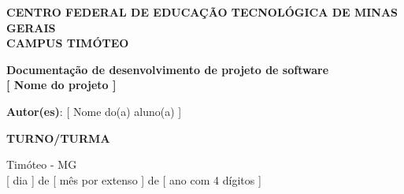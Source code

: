 \begin{center}

{\fontsize{11}{\baselineskip}\selectfont
\textbf{CENTRO FEDERAL DE EDUCAÇÃO TECNOLÓGICA DE MINAS GERAIS \\}}
\vspace{-0.3cm}
{\fontsize{8}{\baselineskip}\selectfont
\textbf{CAMPUS TIMÓTEO \\}}

\vspace{7cm}

{    %
\fontsize{19}{\baselineskip}\selectfont
\textbf{Documentação de desenvolvimento de projeto de software\\}
\textbf{  {\color{red}[ Nome do projeto ]} }}
    
\vspace{7cm}


{\fontsize{12}{\baselineskip}\selectfont
\textbf{Autor(es)}: {\color{red} [ Nome do(a) aluno(a) ]}}

\vspace{0.5cm}

{\fontsize{12}{\baselineskip}\selectfont
\textbf{{\color{red}TURNO/TURMA}}}

\vspace{4.5cm}

{\fontsize{12}{\baselineskip}\selectfont
Timóteo - MG\\
{\color{red} [ dia ]} de {\color{red} [ mês por extenso ] } de {\color{red} [ ano com 4 dígitos ] }}

\end{center}

\newpage